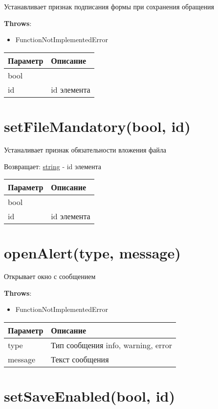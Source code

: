 Устанавливает признак подписания формы при сохранения обращения

\textbf{Throws}:

\begin{itemize}
\tightlist
\item
  FunctionNotImplementedError
\end{itemize}

\begin{longtable}[]{@{}ll@{}}
\toprule
Параметр & Описание\tabularnewline
\midrule
\endhead
bool &\tabularnewline
id & id элемента\tabularnewline
\bottomrule
\end{longtable}

\hypertarget{setfilemandatorybool-id-string}{%
\section{setFileMandatory(bool, id)}\label{setfilemandatorybool-id-string}}

Устаналивает признак обязательности вложения файла

Возвращает: \protect\hyperlink{string}{string} - id элемента

\begin{longtable}[]{@{}ll@{}}
\toprule
Параметр & Описание\tabularnewline
\midrule
\endhead
bool &\tabularnewline
id & id элемента\tabularnewline
\bottomrule
\end{longtable}

\hypertarget{openalerttype-message}{%
\section{openAlert(type, message)}\label{openalerttype-message}}

Открывает окно с сообщением

\textbf{Throws}:

\begin{itemize}
\tightlist
\item
  FunctionNotImplementedError
\end{itemize}

\begin{longtable}[]{@{}ll@{}}
\toprule
Параметр & Описание\tabularnewline
\midrule
\endhead
type & Тип сообщения info, warning, error\tabularnewline
message & Текст сообщения\tabularnewline
\bottomrule
\end{longtable}

\hypertarget{setsaveenabledbool-id-string}{%
\section{setSaveEnabled(bool, id)}\label{setsaveenabledbool-id-string}}

